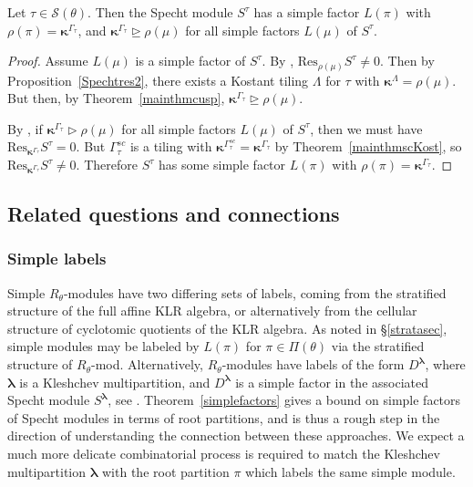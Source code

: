 \documentclass[Unicode,ALCO]{cedram}
\newcommand{\SSSS}{\mathcal{S}}
\newcommand{\0}{{\bar 0}}
\newcommand{\Res}{{\mathrm {Res}}}
\newcommand{\blam}{\boldsymbol{\lambda}}
\newcommand{\bkap}{\boldsymbol{\kappa}}
\begin{document}
\begin{theorem}\label{simplefactors}
Let \(\tau \in \SSSS(\theta)\). Then the Specht module \(S^\tau\) has a simple factor \(L(\pi)\) with \(\rho(\pi) = \bkap^{\Gamma_\tau}\), and \(\bkap^{\Gamma_\tau} \trianglerighteq \rho(\mu)\) for all simple factors \(L(\mu)\) of \(S^\tau\).
\end{theorem}
\begin{proof}
Assume \(L(\mu)\) is a simple factor of \(S^\tau\). By \cite[Theorem~6.8(v)]{KlMuStrat}, \(\Res_{\rho(\mu)} S^\tau \neq 0\). Then by Proposition~\ref{Spechtres2}, there exists a Kostant tiling \(\Lambda\) for \(\tau\) with \(\bkap^\Lambda = \rho(\mu)\). But then, by Theorem~\ref{mainthmcusp}, \(\bkap^{\Gamma_\tau} \trianglerighteq \rho(\mu)\).

By \cite[Theorem~6.8(v)]{KlMuStrat}, if \(\bkap^{\Gamma_\tau}\triangleright \rho(\mu)\) for all simple factors \(L(\mu)\) of \(S^\tau\), then we must have \(\Res_{\bkap^{\Gamma_\tau}}S^\tau =0\). But \(\Gamma^{sc}_\tau\) is a tiling with \(\bkap^{ \Gamma^{sc}_\tau} = \bkap^{\Gamma_\tau}\) by Theorem~\ref{mainthmscKost}, so \(\Res_{\bkap^{\Gamma_\tau}}S^\tau \neq0\). Therefore \(S^\tau\) has some simple factor \(L(\pi)\) with \(\rho(\pi) = \bkap^{\Gamma_\tau}\).
\end{proof}

\subsection{Related questions and connections}

\subsubsection{Simple labels}\label{simplab}
Simple \(R_\theta\)-modules have two differing sets of labels, coming from the stratified structure of the full affine KLR algebra, or alternatively from the cellular structure of cyclotomic quotients of the KLR algebra. As noted in \S\ref{stratasec}, simple modules may be labeled by \(L(\pi)\) for \(\pi \in \Pi(\theta)\) via the stratified structure of \(R_\theta\)-mod.
Alternatively, \(R_\theta\)-modules have labels of the form \(D^{\blam}\), where \(\blam\) is a Kleshchev multipartition, and \(D^{\blam}\) is a simple factor in the associated Specht module \(S^{\blam}\), see \cite{ArMaNumSimp, HuMaCell}. Theorem~\ref{simplefactors} gives a bound on simple factors of Specht  modules in terms of root partitions, and is thus a rough step in the direction of understanding the connection between these approaches. We expect a much more delicate combinatorial process is required to match the Kleshchev multipartition \(\blam\) with the root partition \(\pi\) which labels the same simple module.
\end{document}
